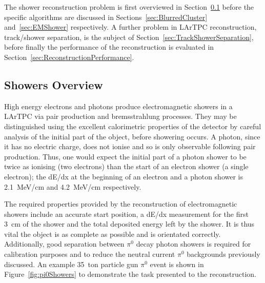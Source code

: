 The shower reconstruction problem is first overviewed in Section~\ref{sec:ShowersOverview} before the specific algorithms are discussed in Sections~\ref{sec:BlurredCluster} and~\ref{sec:EMShower} respectively.  A further problem in LArTPC reconstruction, track/shower separation, is the subject of Section~\ref{sec:TrackShowerSeparation}, before finally the performance of the reconstruction is evaluated in Section~\ref{sec:ReconstructionPerformance}.

\subsection{Showers Overview}\label{sec:ShowersOverview}

High energy electrons and photons produce electromagnetic showers in a LArTPC via pair production and bremsstrahlung processes.  They may be distinguished using the excellent calorimetric properties of the detector by careful analysis of the initial part of the object, before showering occurs.  A photon, since it has no electric charge, does not ionise and so is only observable following pair production.  Thus, one would expect the initial part of a photon shower to be twice as ionising (two electrons) than the start of an electron shower (a single electron); the dE/dx at the beginning of an electron and a photon shower is 2.1~MeV/cm and 4.2~MeV/cm respectively.

The required properties provided by the reconstruction of electromagnetic showers include an accurate start position, a dE/dx measurement for the first 3~cm of the shower and the total deposited energy left by the shower.  It is thus vital the object is as complete as possible and is orientated correctly.  Additionally, good separation between $\pi^0$ decay photon showers is required for calibration purposes and to reduce the neutral current $\pi^0$ backgrounds previously discussed.  An example 35~ton particle gun $\pi^0$ event is shown in Figure~\ref{fig:pi0Showers} to demonstrate the task presented to the reconstruction.

